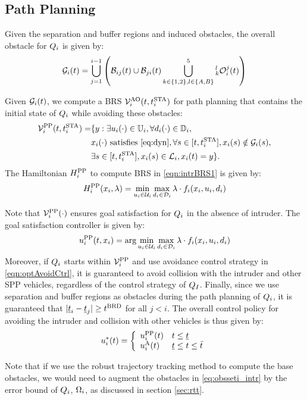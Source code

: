 \subsection{Path Planning} \label{sec:path_planning}
Given the separation and buffer regions and induced obstacles, the overall obstacle for $Q_i$ is given by:
\begin{equation}
\label{eq:obsseti_intr}
\obsset_i(t)  = \bigcup_{j=1}^{i-1} \left( \buff_{ij}(t) \cup \buff_{ji}(t) \bigcup_{k \in\{1, 2\}, l \in \{A, B\}}^{5} {_k^l\ioset_i^j}(t) \right)
\end{equation}

Given $\mathcal{G}_i(t)$, we compute a BRS $\mathcal{V}^{\text{AO}}_{i}(t, t^\text{STA}_i)$ for path planning that contains the initial state of $Q_i$ while avoiding these obstacles:
\begin{equation} \label{eqn:intrBRS1}
\begin{aligned}
\brs^{\text{PP}}_{i}(t, \sta_i) = & \{y: \exists \ctrl_i(\cdot) \in \cfset_i, \forall \dstb_i(\cdot) \in \dfset_i, \\
& \state_i(\cdot) \text{ satisfies \eqref{eq:dyn}}, \forall s \in [t, \sta_i], \state_i(s) \notin \obsset_i(s), \\
& \exists s \in [t, \sta_i], \state_i(s) \in \targetset_i, \state_i(t) = y \}.
\end{aligned}
\end{equation}
The Hamiltonian $H^{\text{PP}}_{i}$ to compute BRS in \eqref{eqn:intrBRS1} is given by:
\begin{equation} \label{eqn:BRSham}
\ham^{\text{PP}}_{i}(\state_i, \costate) = \min_{\ctrl_i \in \cset_i} \max_{\dstb_i \in \dset_i} \costate \cdot f_i (\state_i, \ctrl_i, \dstb_i)
\end{equation}

Note that $\mathcal{V}^{\text{PP}}_{i}(\cdot)$ ensures goal satisfaction for $Q_i$ in the absence of intruder. The goal satisfaction controller is given by:
\begin{equation}
{u^{\text{PP}}_{i}}(t, x_i) = \arg \min_{u_i \in \mathcal{U}_i} \max_{d_i \in \mathcal{D}_i} \lambda \cdot f_i (x_i, u_i, d_i)
\end{equation}
Moreover, if $Q_i$ starts within $\mathcal{V}^{\text{PP}}_{i}$ and use avoidance control strategy in \eqref{eqn:optAvoidCtrl}, it is guaranteed to avoid collision with the intruder and other SPP vehicles, regardless of the control strategy of $Q_{I}$. Finally, since we use separation and buffer regions as obstacles during the path planning of $Q_i$, it is guaranteed that $|\underline{t}_i - \underline{t}_j| \geq t^\text{BRD}$ for all $j < i$. The overall control policy for avoiding the intruder and collision with other vehicles is thus given by:
\begin{equation*}
{u^*_{i}}(t) = 
\left \{ 
\begin{array}{ll}
{u^{\text{PP}}_{i}}(t) & t \leq \underline{t}\\
{u^{\text{A}}_{i}}(t) & \underline{t}\leq t \leq \bar{t}
\end{array}
\right.
\end{equation*}

\begin{remark}
Note that if we use the robust trajectory tracking method to compute the base obstacles, we would need to augment the obstacles in \eqref{eq:obsseti_intr} by the error bound of $Q_i$, $\Omega_i$, as discussed in section \ref{sec:rtt}.
\end{remark}